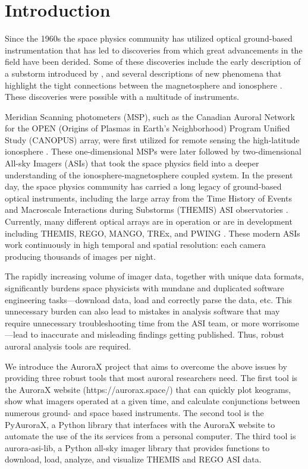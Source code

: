 \documentclass[utf8]{FrontiersinHarvard} %
\begin{document}
\section{Introduction}\label{intro}
Since the 1960s the space physics community has utilized optical ground-based instrumentation that has led to discoveries from which great advancements in the field have been derided. Some of these discoveries include the early description of a substorm introduced by \citet{Akasofu1964}, and several descriptions of new phenomena that highlight the tight connections between the magnetosphere and ionosphere \cite[e.g.][]{Angelopoulos2008, Jones2013, Shumko2021}. These discoveries were possible with a multitude of instruments. 

Meridian Scanning photometers (MSP), such as the Canadian Auroral Network for the OPEN (Origins of Plasmas in Earth's Neighborhood) Program Unified Study (CANOPUS) array, were first utilized for remote sensing the high-latitude ionosphere \citep[e.g.][]{Rostoker1995}. These one-dimensional MSPs were later followed by two-dimensional All-sky Imagers (ASIs) that took the space physics field into a deeper understanding of the ionosphere-magnetosphere coupled system. In the present day, the space physics community has carried a long legacy of ground-based optical instruments, including the large array from the Time History of Events and Macroscale Interactions during Substorms (THEMIS) ASI observatories \citep{Donovan2006, Mende2009}. Currently, many different optical arrays are in operation or are in development including THEMIS, REGO, MANGO, TREx, and PWING  \citep[e.g.][]{Liang2016, Shiokawa2017, Lyons2019, Gillies2019}. These modern ASIs work continuously in high temporal and spatial resolution: each camera producing thousands of images per night.

The rapidly increasing volume of imager data, together with unique data formats, significantly burdens space physicists with mundane and duplicated software engineering tasks---download data, load and correctly parse the data, etc. This unnecessary burden can also lead to mistakes in analysis software that may require unnecessary troubleshooting time from the ASI team, or more worrisome---lead to inaccurate and misleading findings getting published. Thus, robust auroral analysis tools are required.

We introduce the AuroraX project that aims to overcome the above issues by providing three robust tools that most auroral researchers need. The first tool is the AuroraX website (https://aurorax.space/) that can quickly plot keograms, show what imagers operated at a given time, and calculate conjunctions between numerous ground- and space based instruments. The second tool is the PyAuroraX, a Python library that interfaces with the AuroraX website to automate the use of the its services from a personal computer. The third tool is aurora-asi-lib, a Python all-sky imager library that provides functions to download, load, analyze, and visualize THEMIS and REGO ASI data. 
\end{document}
